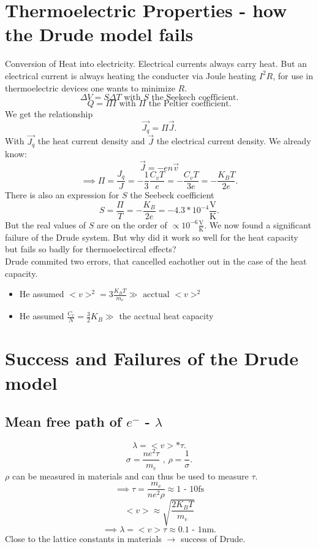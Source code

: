 \documentclass{report}
\begin{document}
\section{Thermoelectric Properties - how the Drude model fails}
Conversion of Heat into electricity. Electrical currents always carry heat. But an electrical current is always heating the conducter via Joule heating $I^2R$, for use in thermoelectric devices one wants to minimize $R$.\\
\[
\Delta V=S \Delta T  \text{  with $S$ the Seekech coefficient}
.\] \[
Q = \Pi I \text{  with $\Pi$ the Peltier coefficient}
.\] We get the relationship \[
\vec{J_q} = \Pi \vec{J}
.\] With $\vec{J_q}$ the heat current density and $\vec{J}$ the electrical current density. We already know: \[
\vec{J} = -e n \vec{v}
\] \[
\implies \Pi = \frac{J_q}{J} = - \frac{1}{3} \frac{C_v T}{e} = - \frac{C_v T}{3e} = - \frac{K_B T}{2 e}
.\]  There is also an expression for $S$ the Seebeck coefficient \[
S= \frac{\Pi}{T} = - \frac{K_B}{2e} = -4.3 * 10^{-4} \frac{\text{V}}{\text{K}}
.\] But the real values of $S$ are on the order of $\propto 10^{-6} \frac{\text{V}}{\text{K}}$. We now found a significant failure of the Drude system. But why did it work so well for the heat capacity but fails so badly for thermoelectircal effects?\\
Drude commited two errors, that cancelled eachother out in the case of the heat capacity.
\begin{itemize}
	\item He assumed $<v>^2 = 3 \frac{K_B T}{m_e} \gg \text{ acctual } <v>^2$ 
	\item He assumed $\frac{C_v}{N} = \frac{3}{2} K_B \gg $ the acctual heat capacity
\end{itemize}
\section{Success and Failures of the Drude model}
\subsection{Mean free path of $e^{-}$ - $\lambda$ }
\[
\lambda = <v> * \tau
.\] \[
\sigma = \frac{ne^2\tau}{m_e}\text{ ,  } \rho = \frac{1}{\sigma}
.\] $\rho$ can be measured in materials and can thus be used to measure $\tau$.  \[
\implies \tau = \frac{m_e}{ne^2\rho} \approx 1 \text{ - } 10 \text{fs}
\] \[
<v> \approx \sqrt{\frac{2K_B T}{m_e}} 
\] \[
\implies \lambda = <v> \tau \approx 0.1 \text{ - } 1 \text{nm}
.\]  Close to the lattice constants in materials $\to $ success of Drude.
\end{document}
